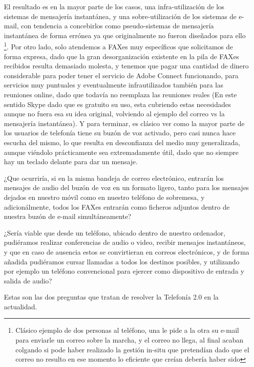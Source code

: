 El resultado es en la mayor parte de los casos, una infra-utilización de los sistemas de mensajería instantánea, y una sobre-utilización de los sistemas de e-mail, con tendencia a concebirlos como pseudo-sistemas de mensajería instantánea de forma errónea ya que originalmente no fueron diseñados para ello \footnote{Clásico ejemplo de dos personas al teléfono, una le pide a la otra su e-mail para enviarle un correo sobre la marcha, y el correo no llega, al final acaban colgando si pode haber realizado la gestión in-situ que pretendían dado que el correo no resulto en ese momento lo eficiente que creían debería haber sido}. Por otro lado, solo atendemos a FAXes muy específicos que solicitamos de forma expresa, dado que la gran desorganización existente en la pila de FAXes recibidos resulta demasiado molesta, y tenemos que pagar una cantidad de dinero considerable para poder tener el servicio de Adobe Connect funcionando, para servicios muy puntuales y eventualmente infrautilizados también para las reuniones online, dado que todavía no reemplaza las reuniones reales (En este sentido Skype dado que es gratuito su uso, esta cubriendo estas necesidades aunque no fuera esa su idea original, volviendo al ejemplo del correo vs la mensajería instantánea). Y para terminar, es clásico ver como la mayor parte de los usuarios de telefonía tiene su buzón de voz activado, pero casi nunca hace escucha del mismo, lo que resulta en desconfianza del medio muy generalizada, aunque viéndolo prácticamente sea extremadamente útil, dado que no siempre hay un teclado delante para dar un mensaje.

¿Que ocurriría, si en la misma bandeja de correo electrónico, entrarán los mensajes de audio del buzón de voz en un formato ligero, tanto para los mensajes dejados en nuestro móvil como en nuestro teléfono de sobremesa, y adicionálmente, todos los FAXes entrarán como ficheros adjuntos dentro de nuestra buzón de e-mail simultáneamente? 

¿Sería viable que desde un teléfono, ubicado dentro de nuestro ordenador, pudiéramos realizar conferencias de audio o video, recibir mensajes instantáneos, y que en caso de ausencia estos se convirtieran en correos electrónicos, y de forma añadida pudiéramos cursar llamadas a todos los destinos posibles, y utilizando por ejemplo un teléfono convencional para ejercer como dispositivo de entrada y salida de audio?

Estas son las dos preguntas que tratan de resolver la Telefonía 2.0 en la actualidad.